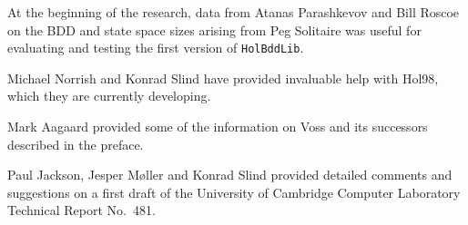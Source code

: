 \documentclass[12pt]{article}
\renewcommand{\t}[1]{\mbox{\tt #1}}
\newcommand\Hol{Hol98\xspace}
\begin{document}
At the beginning of the research, data from Atanas Parashkevov
and Bill Roscoe on the BDD and state space sizes arising from Peg Solitaire
was useful for evaluating and testing the first version of \t{HolBddLib}.

Michael Norrish and Konrad Slind have provided invaluable help with
\Hol, which they are currently developing. 

Mark Aagaard provided some
of the information on Voss and its successors described in
the preface.

Paul Jackson, Jesper M\o{}ller and Konrad Slind provided detailed
comments and suggestions on a first draft of the University of
Cambridge Computer Laboratory Technical Report No.~481.

  

\clearpage
{}
\printindex[MLty]

\clearpage
{}
\printindex[MLbn]
\end{document}
